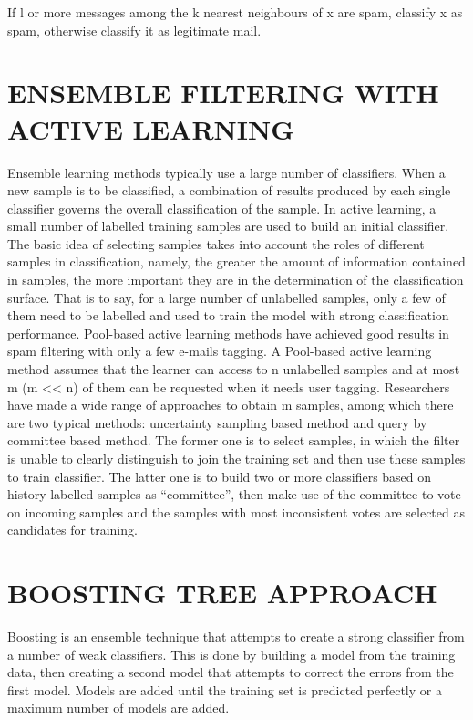 If l or more messages among the k nearest neighbours of x are spam, classify x as spam, otherwise classify it as legitimate mail.

\section{ENSEMBLE FILTERING WITH ACTIVE LEARNING}
Ensemble learning methods typically use a large number of classifiers. When a new sample is to be classified, a combination of results produced by each single classifier governs the overall classification of the sample.
In active learning, a small number of labelled training samples are used to build an initial classifier. The basic idea of selecting samples takes into account the roles of different samples in classification, namely, the greater the amount of information contained in samples, the more important they are in the determination of the classification surface. That is to say, for a large number of unlabelled samples, only a few of them need to be labelled and used to train the model with strong classification performance.
Pool-based active learning methods have achieved good results in spam filtering with only a few e-mails tagging. A Pool-based active learning method assumes that the learner can access to n unlabelled samples and at most m (m << n) of them can be requested when it needs user tagging. Researchers have made a wide range of approaches to obtain m samples, among which there are two typical methods: uncertainty sampling based method and query by committee based method. The former one is to select samples, in which the filter is unable to clearly distinguish to join the training set and then use these samples to train classifier. The latter one is to build two or more classifiers based on history labelled samples as “committee”, then make use of the committee to vote on incoming samples and the samples with most inconsistent votes are selected as candidates for training.

\section{BOOSTING TREE APPROACH}
Boosting is an ensemble technique that attempts to create a strong classifier from a number of weak classifiers. This is done by building a model from the training data, then creating a second model that attempts to correct the errors from the first model. Models are added until the training set is predicted perfectly or a maximum number of models are added.

